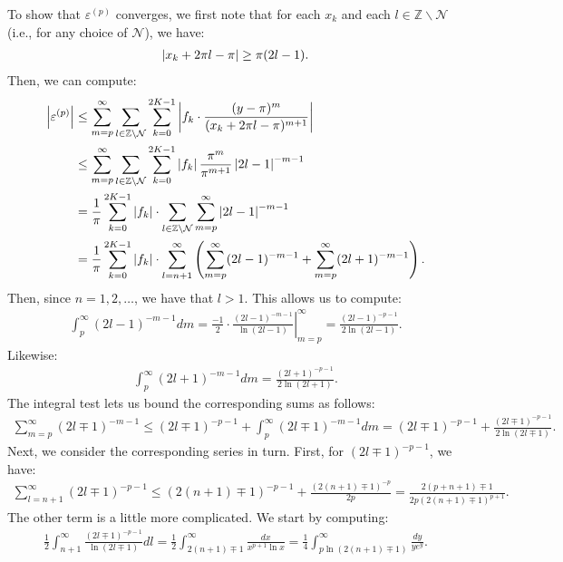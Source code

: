 To show that $\varepsilon^{(p)}$ converges, we first note that for
each $x_k$ and each $l \in \mathbb{Z} \backslash \mathcal{N}$ (i.e., for
any choice of $\mathcal{N}$), we have:
\begin{align*}
  \left|x_k + 2\pi l - \pi\right| \geq \pi (2l - 1).
\end{align*}
Then, we can compute:
\begin{align*}
  \left|\varepsilon^{(p)}\right| &\leq \sum_{m=p}^\infty \sum_{l \in \mathbb{Z} \backslash \mathcal{N}} \sum_{k=0}^{2K-1} \left|f_k \cdot \frac{(y-\pi)^m}{(x_k + 2\pi l - \pi)^{m+1}}\right| \\
  &\leq \sum_{m=p}^\infty \sum_{l \in \mathbb{Z} \backslash \mathcal{N}} \sum_{k=0}^{2K-1} \left|f_k\right| \frac{\pi^m}{\pi^{m+1}} \left|2l - 1\right|^{-m-1} \\
  &= \frac{1}{\pi} \sum_{k=0}^{2K-1} \left|f_k\right| \cdot \sum_{l \in \mathbb{Z} \backslash \mathcal{N}} \sum_{m=p}^\infty \left|2l - 1\right|^{-m-1} \\
  &= \frac{1}{\pi} \sum_{k=0}^{2K-1} \left|f_k\right| \cdot \sum_{l=n+1}^\infty \left(\sum_{m=p}^\infty (2l - 1)^{-m-1} + \sum_{m=p}^\infty (2l + 1)^{-m-1}\right).
\end{align*}
Then, since $n = 1, 2, \hdots$, we have that $l > 1$. This allows us to compute:
\begin{align*}
  \int_p^\infty {(2l - 1)}^{-m-1} dm = \left. \frac{-1}{2} \cdot \frac{{(2l - 1)}^{-m-1}}{\ln(2l - 1)} \right|_{m=p}^{\infty} = \frac{(2l - 1)^{-p-1}}{2 \ln(2l - 1)}.
\end{align*}
Likewise:
\begin{align*}
  \int_p^\infty {(2l + 1)}^{-m-1} dm = \frac{(2l + 1)^{-p-1}}{2 \ln(2l + 1)}.
\end{align*}
The integral test lets us bound the corresponding sums as follows:
\begin{align*}
  \sum_{m=p}^\infty (2l \mp 1)^{-m-1} \leq (2l \mp 1)^{-p-1} + \int_p^\infty {(2l \mp 1)}^{-m-1} dm = (2l \mp 1)^{-p-1} + \frac{(2l \mp 1)^{-p-1}}{2 \ln(2l \mp 1)}.
\end{align*}
Next, we consider the corresponding series in turn. First, for $(2l \mp 1)^{-p-1}$, we have:
\begin{align*}
  \sum_{l=n+1}^\infty (2l \mp 1)^{-p-1} \leq (2(n+1) \mp 1)^{-p-1} + \frac{(2(n+1) \mp 1)^{-p}}{2p} = \frac{2(p+n+1) \mp 1}{2p(2(n+1) \mp 1)^{p+1}}.
\end{align*}
The other term is a little more complicated. We start by computing:
\begin{align*}
  \frac{1}{2} \int_{n+1}^\infty \frac{(2l \mp 1)^{-p-1}}{\ln(2l \mp 1)} dl = \frac{1}{2} \int_{2(n+1) \mp 1}^\infty \frac{dx}{x^{p+1} \ln x} = \frac{1}{4} \int_{p \ln(2(n+1) \mp 1)}^\infty \frac{dy}{ye^y}.
\end{align*}
